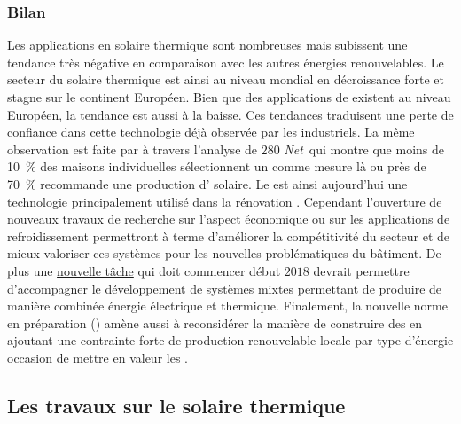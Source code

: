 \subsubsection{Bilan} %
\label{ssub:bilan_evolution}
Les applications en solaire thermique sont nombreuses mais subissent
une tendance très négative en comparaison avec les autres énergies renouvelables. Le
secteur du solaire thermique est ainsi au niveau mondial en décroissance forte et stagne
sur le continent Européen. Bien que des applications de  existent au niveau
Européen, la tendance est aussi à la baisse. Ces tendances traduisent une perte de
confiance dans cette technologie déjà observée par les industriels. La même observation
est faite par \textcite{Musall2010} à travers l’analyse de $280$ \textit{Net}\, qui
montre que moins de \SI{10}{\percent} des maisons individuelles sélectionnent un 
comme mesure là ou près de \SI{70}{\percent} recommande une production d’
solaire. Le  est ainsi aujourd’hui une technologie principalement utilisé dans la rénovation
\parencite{Ellehauge2003}. Cependant l’ouverture de nouveaux travaux de recherche
sur l’aspect économique ou sur les applications de refroidissement
permettront à terme d’améliorer la compétitivité du secteur et de mieux valoriser ces systèmes pour les nouvelles
problématiques du bâtiment.
De plus une \href{http://www.iea-shc.org/article?NewsID=173}{nouvelle tâche} qui doit
commencer début $2018$ devrait permettre d’accompagner le développement de systèmes mixtes
permettant de produire de manière combinée énergie électrique et thermique. Finalement, la
nouvelle norme en préparation () amène aussi à reconsidérer la manière
de construire des  en ajoutant une contrainte forte de production renouvelable
locale par type d’énergie occasion de mettre en valeur les .


\subsection{Les travaux sur le solaire thermique} %
\label{sub:les_travaux_sur_le_solaire_thermique}
